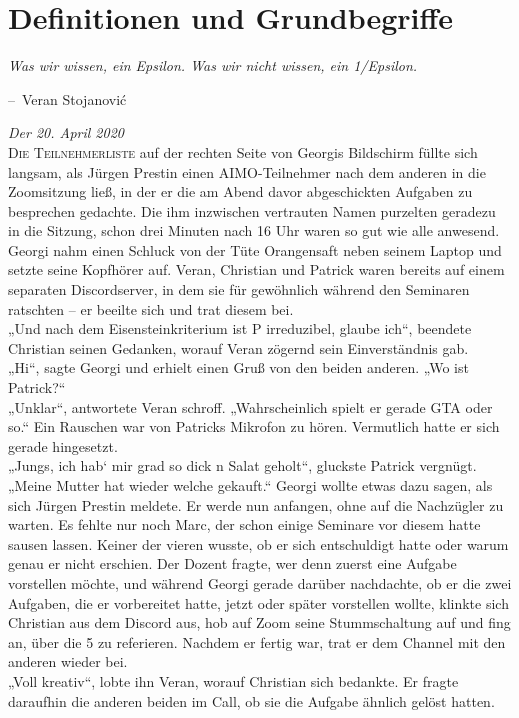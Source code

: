 \documentclass[oneside]{memoir}
\makeatletter
\newenvironment{chapquote}[2][2em]
  {\setlength{\@tempdima}{#1}%
   \def\chapquote@author{#2}%
   \parshape 1 \@tempdima \dimexpr\textwidth-2\@tempdima\relax%
   \itshape}
  {\par\normalfont\hfill--\ \chapquote@author\hspace*{\@tempdima}\par\bigskip}
\makeatother
\begin{document}
\chapter{Definitionen und Grundbegriffe} %
\begin{chapquote}{Veran Stojanović}
\glqq Was wir wissen, ein Epsilon. Was wir nicht wissen, ein 1/Epsilon.\grqq
\end{chapquote}
\textit{Der 20. April 2020} \\ 
\lettrine{D}{ie Teilnehmerliste} auf der rechten Seite von Georgis Bildschirm füllte sich langsam, als Jürgen Prestin einen AIMO-Teilnehmer nach dem anderen in die Zoomsitzung ließ, in der er die am Abend davor abgeschickten Aufgaben zu besprechen gedachte. Die ihm inzwischen vertrauten Namen purzelten geradezu in die Sitzung, schon drei Minuten nach 16 Uhr waren so gut wie alle anwesend. Georgi nahm einen Schluck von der Tüte Orangensaft neben seinem Laptop und setzte seine Kopfhörer auf. Veran, Christian und Patrick waren bereits auf einem separaten Discordserver, in dem sie für gewöhnlich während den Seminaren ratschten – er beeilte sich und trat diesem bei. \\
„Und nach dem Eisensteinkriterium ist P irreduzibel, glaube ich“, beendete Christian seinen Gedanken, worauf Veran zögernd sein Einverständnis gab. \\
„Hi“, sagte Georgi und erhielt einen Gruß von den beiden anderen. „Wo ist Patrick?“ \\
„Unklar“, antwortete Veran schroff. „Wahrscheinlich spielt er gerade GTA oder so.“
Ein Rauschen war von Patricks Mikrofon zu hören. Vermutlich hatte er sich gerade hingesetzt. \\ 
„Jungs, ich hab‘ mir grad so dick n Salat geholt“, gluckste Patrick vergnügt. „Meine Mutter hat wieder welche gekauft.“
Georgi wollte etwas dazu sagen, als sich Jürgen Prestin meldete. Er werde nun anfangen, ohne auf die Nachzügler zu warten. Es fehlte nur noch Marc, der schon einige Seminare vor diesem hatte sausen lassen. Keiner der vieren wusste, ob er sich entschuldigt hatte oder warum genau er nicht erschien. Der Dozent fragte, wer denn zuerst eine Aufgabe vorstellen möchte, und während Georgi gerade darüber nachdachte, ob er die zwei Aufgaben, die er vorbereitet hatte, jetzt oder später vorstellen wollte, klinkte sich Christian aus dem Discord aus, hob auf Zoom seine Stummschaltung auf und fing an, über die 5 zu referieren. 
Nachdem er fertig war, trat er dem Channel mit den anderen wieder bei.  \\
„Voll kreativ“, lobte ihn Veran, worauf Christian sich bedankte. Er fragte daraufhin die anderen beiden im Call, ob sie die Aufgabe ähnlich gelöst hatten. \\
\end{document}
